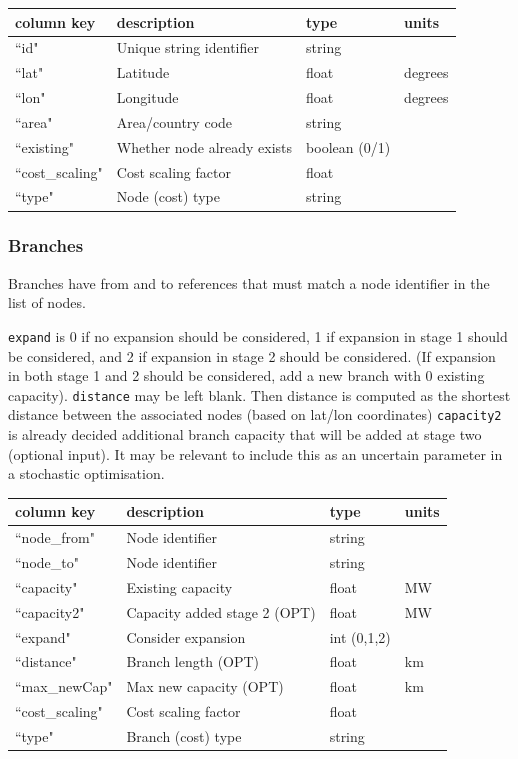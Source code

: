 \documentclass{article}
\begin{document}
\medskip
\begin{tabular}{llll}
	\hline
	column key & description & type & units \\
	\hline
	``id"	&	Unique string identifier 	& string	& \\
	``lat"	&	Latitude				& float 	& degrees \\
	``lon"	&	Longitude				& float	& degrees \\
	``area" &	Area/country code		& string	& \\
	``existing" &	Whether node already exists		& boolean (0/1)	& \\
	``cost\_scaling"	&	Cost scaling factor & float	&  \\
	``type"	&	Node (cost) type & string	&  \\
	\hline
\end{tabular}


\subsubsection{Branches}
Branches have from and to references that must match a node identifier in the list of nodes.

\texttt{expand} is 0 if no expansion should be considered, 1 if expansion in stage 1 should be considered, and 2 if expansion in stage 2 should be considered. (If expansion in both stage 1 and 2 should be considered, add a new branch with 0 existing capacity).
\texttt{distance} may be left blank. Then distance is computed as the shortest distance between the associated nodes (based on lat/lon coordinates)
\texttt{capacity2} is already decided additional branch capacity that will be added at stage two (optional input). It may be relevant to include this as an uncertain parameter in a stochastic optimisation.

\medskip
\begin{tabular}{llll}
	\hline
	column key & description & type & units \\
	\hline
	``node\_from"	&	Node identifier 	& string	& \\
	``node\_to"		&	Node identifier	& string	& \\
	``capacity"		&	Existing capacity & float		& MW \\
	``capacity2"		&	Capacity added stage 2 (OPT) & float		& MW \\
	``expand"			&	Consider expansion & int (0,1,2)		& \\
	``distance"		&	Branch length (OPT) & float		& km \\
	``max\_newCap"		&	Max new capacity (OPT) & float		& km \\
	``cost\_scaling"	&	Cost scaling factor & float	&  \\
	``type"			&	Branch (cost) type & string		&  \\

	\hline
\end{tabular}
\end{document}
